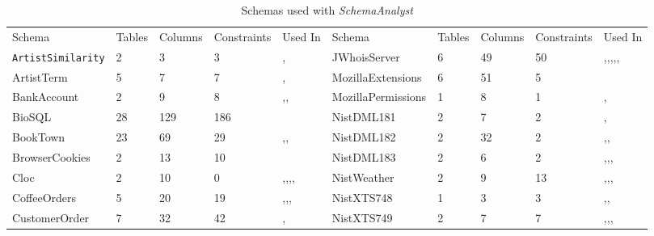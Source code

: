 \begin{table*}[t]
  \scriptsize
  \centering
  \caption{Schemas used with \textit{SchemaAnalyst}} \label{tab:schemas}
  \begin{tabular}{llllllllll}
    Schema&Tables&Columns&Constraints&Used In&Schema&Tables&Columns&Constraints&Used In \\
    {\tt ArtistSimilarity}&2&3&3&\cite{wright2014impact},\cite{mcminn2015effectiveness}&
    JWhoisServer&6&49&50&\cite{mcminn2016virtual},\cite{kapfhammer2013search},\cite{wright2013efficient},\cite{wright2014impact},\cite{mcminn2015effectiveness},\cite{kinneer2015automatically}\\
    ArtistTerm&5&7&7&\cite{wright2014impact},\cite{mcminn2015effectiveness}&
    MozillaExtensions&6&51&5&\cite{mcminn2015effectiveness} \\
    BankAccount&2&9&8&\cite{kapfhammer2013search},\cite{wright2014impact},\cite{mcminn2015effectiveness}&
    MozillaPermissions&1&8&1&\cite{mcminn2016virtual},\cite{mcminn2015effectiveness}\\
    BioSQL&28&129&186&\cite{kinneer2015automatically}&
    NistDML181&2&7&2&\cite{kapfhammer2013search},\cite{mcminn2015effectiveness}  \\
    BookTown&23&69&29&\cite{kapfhammer2013search},\cite{wright2014impact},\cite{mcminn2015effectiveness}&
    NistDML182&2&32&2&\cite{kapfhammer2013search},\cite{wright2013efficient},\cite{mcminn2015effectiveness}  \\
    BrowserCookies&2&13&10&\cite{mcminn2015effectiveness}&NistDML183&2&6&2&\cite{kapfhammer2013search},\cite{wright2013efficient},\cite{wright2014impact},\cite{mcminn2015effectiveness}  \\
    Cloc&2&10&0&\cite{kapfhammer2013search},\cite{wright2013efficient},\cite{wright2014impact},\cite{mcminn2015effectiveness},\cite{kinneer2015automatically}&NistWeather&2&9&13&\cite{mcminn2016virtual},\cite{kapfhammer2013search},\cite{mcminn2015effectiveness},\cite{kinneer2015automatically}\\
    CoffeeOrders&5&20&19&\cite{mcminn2016virtual},\cite{kapfhammer2013search},\cite{wright2014impact},\cite{mcminn2015effectiveness}&NistXTS748&1&3&3&\cite{kapfhammer2013search},\cite{mcminn2015effectiveness},\cite{kinneer2015automatically} \\
    CustomerOrder&7&32&42&\cite{kapfhammer2013search},\cite{mcminn2015effectiveness}&NistXTS749&2&7&7&\cite{kapfhammer2013search},\cite{wright2014impact},\cite{mcminn2015effectiveness},\cite{kinneer2015automatically} \\

\end{tabular}
\end{table*}
